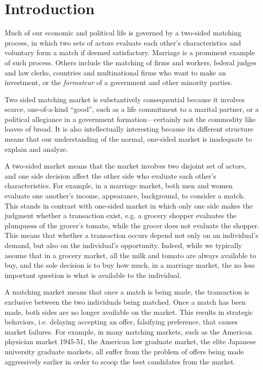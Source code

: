 \chapter{Introduction}

Much of our economic and political life is governed by a two-sided matching
process, in which two sets of actors evaluate each other's characteristics and
voluntary form a match if deemed satisfactory. Marriage is a prominent example
of such process. Others include the matching of firms and workers, federal
judges and law clerks, countries and multinational firms who want to make an
investment, or the \textit{formateur} of a government and other minority parties.

Two sided matching market is substantively consequential because it 
involves scarce, one-of-a-kind ``good'', such as a life commitment to a marital
partner, or a political allegiance in a government formation---certainly not the
commodity like loaves of bread. It is also intellectually interesting because
its different structure means that our understanding of the normal, one-sided
market is inadequate to explain and analyze.

A two-sided market means that the market involves two disjoint set
of actors, and one side decision affect the other side \citep{Rysman2009}  who evaluate each other's characteristics. For example, in a marriage
market, both men and women evaluate one another's income, appearance,
background, to consider a match. This stands in contrast with one-sided market
in which only one side makes the judgment whether a transaction exist, e.g. a
grocery shopper evaluates the plumpness of the grocer's tomato, while the grocer
does not evaluate the shopper. This means that whether a transaction occurs
depend not only on an individual's demand, but also on the individual's
opportunity. Indeed, while we typically assume that in a grocery market, all the
milk and tomato are always available to buy, and the sole decision is to buy how
much, in a marriage market, the no less important question is what is available
to the individual.

A matching market means that once a match is being made, the transaction is
exclusive between the two individuals being matched. Once a match has
been made, both sides are no longer available on the market. This results in
strategic behaviors, i.e. delaying accepting an offer, falsifying preference,
that causes market failures. For example, in many matching markets, such as the
American physician market 1945-51, the American law graduate market, the elite
Japanese university graduate markets, all suffer from the problem of offers
being made aggressively earlier in order to scoop the best candidates from the market.

